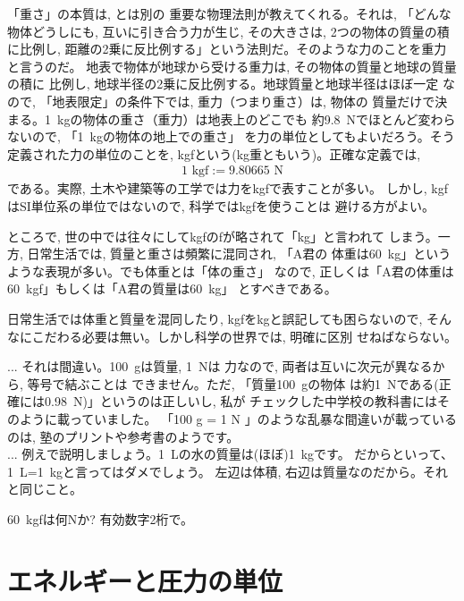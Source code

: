 「重さ」の本質は, とは別の
重要な物理法則が教えてくれる。それは, 「どんな物体どうしにも, 
互いに引き合う力が生じ, その大きさは, 2つの物体の質量の積に比例し, 
距離の2乗に反比例する」という法則だ。そのような力のことを重力と言うのだ。
地表で物体が地球から受ける重力は, その物体の質量と地球の質量の積に
比例し, 地球半径の2乗に反比例する。地球質量と地球半径はほぼ一定
なので, 「地表限定」の条件下では, 重力（つまり重さ）は, 物体の
質量だけで決まる。1~kgの物体の重さ（重力）は地表上のどこでも
約9.8~Nでほとんど変わらないので, 「1~kgの物体の地上での重さ」
を力の単位としてもよいだろう。そう定義された力の単位のことを, 
kgfという(kg重ともいう)。正確な定義では, 
\begin{eqnarray}
1 \text{ kgf}:=9.80665\text{ N}
\end{eqnarray}
である。実際, 土木や建築等の工学では力をkgfで表すことが多い。
しかし, kgfはSI単位系の単位ではないので, 科学ではkgfを使うことは
避ける方がよい。

ところで, 世の中では往々にしてkgfのfが略されて「kg」と言われて
しまう。一方, 日常生活では, 質量と重さは頻繁に混同され, 「A君の
体重は60~kg」というような表現が多い。でも体重とは「体の重さ」
なので, 正しくは「A君の体重は60~kgf」もしくは「A君の質量は60~kg」
とすべきである。

日常生活では体重と質量を混同したり, kgfをkgと誤記しても困らないので, 
そんなにこだわる必要は無い。しかし科学の世界では, 明確に区別
せねばならない。\mv

\begin{faq}{\small{} ... それは間違い。100~gは質量, 1~Nは
力なので, 両者は互いに次元が異なるから, 等号で結ぶことは
できません。ただ, 「質量100~gの物体
は約1~Nである(正確には0.98~N)」というのは正しいし, 私が
チェックした中学校の教科書にはそのように載っていました。
「100 g = 1 N 」のような乱暴な間違いが載っているのは, 
塾のプリントや参考書のようです。\\
 ... 
例えで説明しましょう。1~Lの水の質量は(ほぼ)1~kgです。
だからといって、 1~L=1~kgと言ってはダメでしょう。
左辺は体積, 右辺は質量なのだから。それと同じこと。}\end{faq}

\begin{q}\label{q:kgf} 60~kgfは何Nか? 有効数字2桁で。\end{q}
\hv


\section{エネルギーと圧力の単位}\label{sect:energy_pressure}

